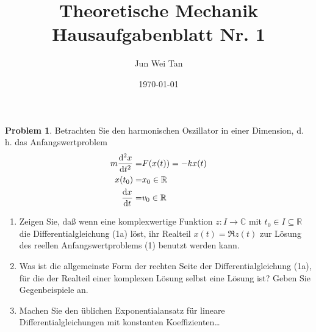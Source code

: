 \documentclass[prb,12pt]{revtex4-2}
\theoremstyle{definition}
\newtheorem{Problem}{Problem}
\theoremstyle{definition}
\newcommand{\R}{\mathbb{R}}
\newcommand{\C}{\mathbb{C}}
\begin{document}
	\title{Theoretische Mechanik Hausaufgabenblatt Nr. 1}
	\author{Jun Wei Tan}
	\date{\today}
	\maketitle
\begin{Problem}
	Betrachten Sie den harmonischen Oszillator in einer Dimension, d. h. das Anfangswertproblem
	\begin{align*}
		m\dv[2]{x}{t}(t)=&F(x(t))=-kx(t)\\
		x(t_0)=&x_0\in \R\\
		\dv{x}{t}(t_0)=&v_0\in \R
	\end{align*}
\begin{enumerate}
	\item Zeigen Sie, daß wenn eine komplexwertige Funktion $z : I \to \C$ mit $t_0 \in I \subseteq \R$ die Differentialgleichung (1a) löst, ihr Realteil $x(t) = \Re z(t)$ zur Lösung des reellen Anfangswertproblems (1) benutzt werden kann.
	\item Was ist die allgemeinste Form der rechten Seite der Differentialgleichung (1a), für die der Realteil einer komplexen Lösung selbst eine Lösung ist? Geben Sie Gegenbeispiele an.
	\item Machen Sie den üblichen Exponentialansatz für lineare Differentialgleichungen mit konstanten Koeffizienten\ldots 
\end{enumerate}
\end{Problem}
\end{document}
